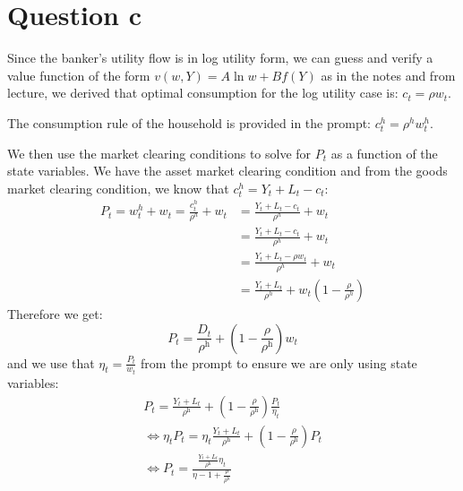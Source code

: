 \documentclass{article}
\begin{document}
\section*{Question c}
Since the banker's utility flow is in log utility form, we can guess and verify a value function of the form $v(w, Y)=A \ln w+B f(Y)$ as in the notes and from lecture, we derived that optimal consumption for the log utility case is: $\boxed{c_{t}=\rho w_{t}}$.

The consumption rule of the household is provided in the prompt: $\boxed{c_t^h = \rho^h w^h_t}$.

We then use the market clearing conditions to solve for $P_t$ as a function of the state variables. We have the asset market clearing condition and from the goods market clearing condition, we know that $c_t^h = Y_t + L_t - c_t$:
\[
\begin{aligned}
    P_t = w_t^h + w_t = \frac{c_t^h}{\rho^h} + w_t &= \frac{Y_t + L_t - c_t}{\rho^h} + w_t\\
    &= \frac{Y_t + L_t - c_t}{\rho^h} + w_t\\
    &= \frac{Y_t + L_t - \rho w_t}{\rho^h} + w_t\\
    &= \frac{Y_t + L_t}{\rho^h} + w_t\left(1 - \frac{\rho}{\rho^h}\right)
\end{aligned}
\]
Therefore we get:
\[
P_{t}=\frac{D_{t}}{\rho^{\mathrm{h}}}+\left(1-\frac{\rho}{\rho^{\mathrm{h}}}\right) w_{t}
\]
and we use that $\eta_t = \frac{P_t}{w_t}$ from the prompt to ensure we are only using state variables:
\[
\begin{aligned}
    P_{t}=\frac{Y_{t} + L_t}{\rho^{\mathrm{h}}}+\left(1-\frac{\rho}{\rho^{\mathrm{h}}}\right) \frac{P_t}{\eta_t}\\
    \iff \eta_t P_t = \eta_t \frac{Y_{t} + L_t}{\rho^{\mathrm{h}}}+\left(1-\frac{\rho}{\rho^{\mathrm{h}}}\right) P_t\\
    \iff \boxed{P_t = \frac{\frac{Y_{t} + L_t}{\rho^{\mathrm{h}}}\eta_t}{\eta - 1 + \frac{\rho}{\rho^h}}}
\end{aligned}
\]
\end{document}
